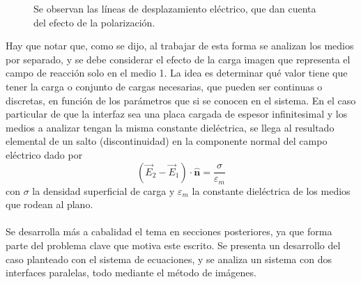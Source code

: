\documentclass[12pt, oneside, numbers, spanish]{ezthesis}
\numberwithin{equation}{section}
\begin{document}
\begin{figure}[H]
	\vspace{2cm}
	\centering
	
	\caption{Se observan las líneas de desplazamiento eléctrico, que dan cuenta del efecto de la polarización.}\label{Fig:Fig_2}
\end{figure}
\noindent
Hay que notar que, como se dijo, al trabajar de esta forma se analizan los medios por separado, y se debe considerar el efecto de la carga imagen que representa el campo de reacción solo en el medio 1. La idea es determinar qué valor tiene que tener la carga o conjunto de cargas necesarias, que pueden ser continuas o discretas, en función de los parámetros que si se conocen en el sistema. En el caso particular de que la interfaz sea una placa cargada de espesor infinitesimal y los medios a analizar tengan la misma constante dieléctrica, se llega al resultado elemental de un salto (discontinuidad) en la componente normal del campo eléctrico dado por
\begin{equation}
(\vec{E}_2 - \vec{E}_1)\cdot\hat{\mathbf{n}} = \frac{\sigma}{\varepsilon_m}
\end{equation}
con $\sigma$ la densidad superficial de carga y $\varepsilon_m$ la constante dieléctrica de los medios que rodean al plano. \\\\
Se desarrolla más a cabalidad el tema en secciones posteriores, ya que forma parte del problema clave que motiva este escrito. Se presenta un desarrollo del caso planteado con el sistema de ecuaciones, y se analiza un sistema con dos interfaces paralelas, todo mediante el método de imágenes. 
\end{document}
